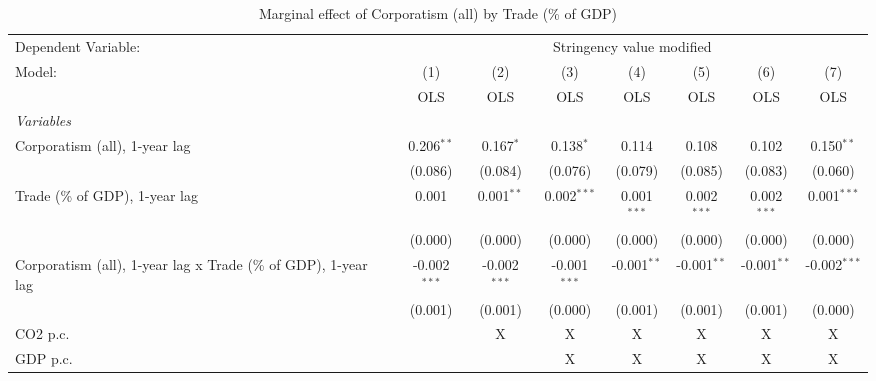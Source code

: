 
\begin{table}[htbp]
   \caption{Marginal effect of Corporatism (all) by Trade (\% of GDP)}
   \centering
   \begin{tabular}{lccccccc}
      \toprule
      Dependent Variable: & \multicolumn{7}{c}{Stringency value modified}\\
      Model:                                                         & (1)            & (2)            & (3)            & (4)           & (5)           & (6)           & (7)\\  
                                                                     &  OLS           & OLS            & OLS            & OLS           & OLS           & OLS           & OLS\\  
      \midrule
      \emph{Variables}\\
      Corporatism (all), 1-year lag                                  & 0.206$^{**}$   & 0.167$^{*}$    & 0.138$^{*}$    & 0.114         & 0.108         & 0.102         & 0.150$^{**}$\\   
                                                                     & (0.086)        & (0.084)        & (0.076)        & (0.079)       & (0.085)       & (0.083)       & (0.060)\\   
      Trade (\% of GDP), 1-year lag                                  & 0.001          & 0.001$^{**}$   & 0.002$^{***}$  & 0.001$^{***}$ & 0.002$^{***}$ & 0.002$^{***}$ & 0.001$^{***}$\\   
                                                                     & (0.000)        & (0.000)        & (0.000)        & (0.000)       & (0.000)       & (0.000)       & (0.000)\\   
      Corporatism (all), 1-year lag x Trade (\% of GDP), 1-year lag  & -0.002$^{***}$ & -0.002$^{***}$ & -0.001$^{***}$ & -0.001$^{**}$ & -0.001$^{**}$ & -0.001$^{**}$ & -0.002$^{***}$\\   
                                                                     & (0.001)        & (0.001)        & (0.000)        & (0.001)       & (0.001)       & (0.001)       & (0.000)\\   
      CO2 p.c.                                                       &                & X              & X              & X             & X             & X             & X\\  
      GDP p.c.                                                       &                &                & X              & X             & X             & X             & X\\  

\end{tabular}
\end{table}
